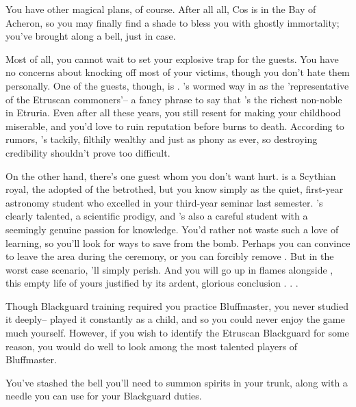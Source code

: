 \documentclass[char]{Kos}
\begin{document}
You have other magical plans, of course. After all all, Cos is in the Bay of Acheron, so you may finally find a shade to bless you with ghostly immortality; you've brought along a bell, just in case. 

Most of all, you cannot wait to set your explosive trap for the guests. You have no concerns about knocking off most of your victims, though you don't hate them personally. One of the guests, though, is \cMerchant{}. \cMerchant{\They}'s wormed \cMerchant{\their} way in as the 'representative of the Etruscan commoners'-- a fancy phrase to say that \cMerchant{\they}'s the richest non-noble in Etruria. Even after all these years, you still resent \cMerchant{\them} for making your childhood miserable, and you'd love to ruin \cMerchant{\their} reputation before \cMerchant{\they} burns to death. According to rumors, \cMerchant{\they}'s tackily, filthily wealthy and just as phony as ever, so destroying \cMerchant{\their} credibility shouldn't prove too difficult.

On the other hand, there's one guest whom you don't want hurt. \cWard{} is a Scythian royal, the adopted \cWard{\sibling} of the betrothed, but you know \cWard{\them} simply as the quiet, first-year astronomy student who excelled in your third-year seminar last semester. \cWard{\They}'s clearly talented, a scientific prodigy, and \cWard{\they}'s also a careful student with a seemingly genuine passion for knowledge. You'd rather not waste such a love of learning, so you'll look for ways to save \cWard{\them} from the bomb. Perhaps you can convince \cWard{\them} to leave the area during the ceremony, or you can forcibly remove \cWard{\them}. But in the worst case scenario, \cWard{\they}'ll simply perish. And you will go up in flames alongside \cWard{\them}, this empty life of yours justified by its ardent, glorious conclusion . . .

\begin{itemz}[Notes]
  \item Though Blackguard training required you practice Bluffmaster, you never studied it deeply--\cMerchant{} played it constantly as a child, and so you could never enjoy the game much yourself. However, if you wish to identify the Etruscan Blackguard for some reason, you would do well to look among the most talented players of Bluffmaster.
  \item You've stashed the bell you'll need to summon spirits in your trunk, along with a needle you can use for your Blackguard duties. 
\end{itemz}
\end{document}
